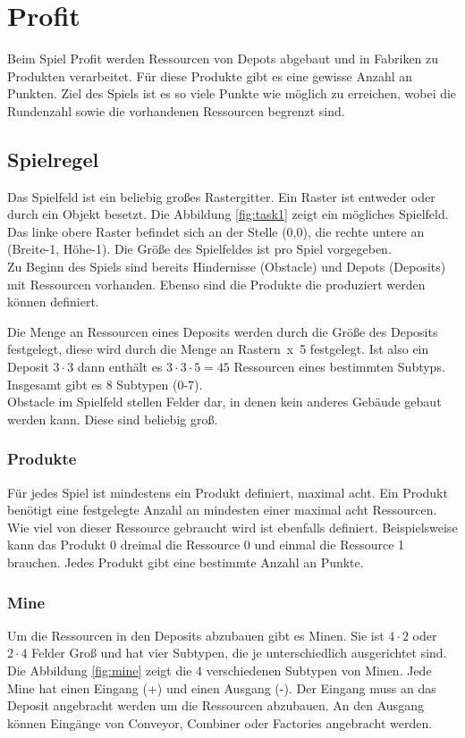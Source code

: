 \section{Profit}
Beim Spiel Profit werden Ressourcen von Depots abgebaut und in Fabriken zu Produkten verarbeitet. Für diese Produkte gibt es eine gewisse Anzahl an Punkten. Ziel des Spiels ist es so viele Punkte wie möglich zu erreichen, wobei die Rundenzahl sowie die vorhandenen Ressourcen begrenzt sind.

\subsection{Spielregel}
Das Spielfeld ist ein beliebig großes Rastergitter. Ein Raster ist entweder oder durch ein Objekt besetzt.
Die Abbildung \ref{fig:task1} zeigt ein mögliches Spielfeld.
Das linke obere Raster befindet sich an der Stelle (0,0), die rechte untere an (Breite-1, Höhe-1). Die Größe des Spielfeldes ist pro Spiel vorgegeben. \\

Zu Beginn des Spiels sind bereits Hindernisse (Obstacle) und Depots (Deposits) mit Ressourcen vorhanden.
Ebenso sind die Produkte die produziert werden können definiert.

Die Menge an Ressourcen eines Deposits werden durch die Größe des Deposits festgelegt, diese wird durch die Menge an Rastern~x~5 festgelegt. Ist also ein Deposit $3 \cdot 3$  dann enthält es $3 \cdot 3\cdot 5 = 45$ Ressourcen eines bestimmten Subtyps. Insgesamt gibt es 8 Subtypen (0-7).\\

Obstacle im Spielfeld stellen Felder dar, in denen kein anderes Gebäude gebaut werden kann. Diese sind beliebig groß. 

\subsubsection*{Produkte}
Für jedes Spiel ist mindestens ein Produkt definiert, maximal acht. Ein Produkt benötigt eine festgelegte Anzahl an mindesten einer maximal acht Ressourcen. Wie viel von dieser Ressource gebraucht wird ist ebenfalls definiert. Beispielsweise kann das Produkt 0 dreimal die Ressource 0 und einmal die Ressource 1 brauchen. Jedes Produkt gibt eine bestimmte Anzahl an Punkte.

\subsubsection*{Mine}
Um die Ressourcen in den Deposits abzubauen gibt es Minen. Sie ist $4\cdot 2$ oder  $2\cdot 4$ Felder Groß und hat vier Subtypen, die je unterschiedlich ausgerichtet sind. Die Abbildung \ref{fig:mine} zeigt die 4 verschiedenen Subtypen von Minen.
Jede Mine hat einen Eingang (+) und einen Ausgang (-). Der Eingang muss an das Deposit angebracht werden um die Ressourcen abzubauen. An den Ausgang können Eingänge von Conveyor, Combiner oder Factories angebracht werden. 

